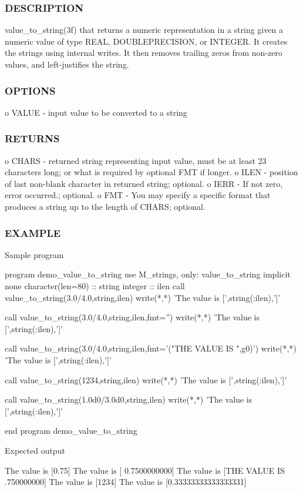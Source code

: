 \subsubsection*{D\+E\+S\+C\+R\+I\+P\+T\+I\+ON}

\begin{DoxyVerb}value_to_string(3f)
that returns a numeric representation in a string given a numeric value of type
REAL, DOUBLEPRECISION, or INTEGER. It creates the strings using internal writes.
It then removes trailing zeros from non-zero values, and left-justifies the string.
\end{DoxyVerb}


\subsubsection*{O\+P\+T\+I\+O\+NS}

o V\+A\+L\+UE -\/ input value to be converted to a string \subsubsection*{R\+E\+T\+U\+R\+NS}

o C\+H\+A\+RS -\/ returned string representing input value, must be at least 23 characters long; or what is required by optional F\+MT if longer. o I\+L\+EN -\/ position of last non-\/blank character in returned string; optional. o I\+E\+RR -\/ If not zero, error occurred.; optional. o F\+MT -\/ You may specify a specific format that produces a string up to the length of C\+H\+A\+RS; optional.

\subsubsection*{E\+X\+A\+M\+P\+LE}

\begin{DoxyVerb}Sample program

  program demo_value_to_string
  use M_strings, only: value_to_string
  implicit none
  character(len=80) :: string
  integer           :: ilen
     call value_to_string(3.0/4.0,string,ilen)
     write(*,*) 'The value is [',string(:ilen),']'

     call value_to_string(3.0/4.0,string,ilen,fmt='')
     write(*,*) 'The value is [',string(:ilen),']'

     call value_to_string(3.0/4.0,string,ilen,fmt='("THE VALUE IS ",g0)')
     write(*,*) 'The value is [',string(:ilen),']'

     call value_to_string(1234,string,ilen)
     write(*,*) 'The value is [',string(:ilen),']'

     call value_to_string(1.0d0/3.0d0,string,ilen)
     write(*,*) 'The value is [',string(:ilen),']'

  end program demo_value_to_string

Expected output

 The value is [0.75]
 The value is [      0.7500000000]
 The value is [THE VALUE IS .750000000]
 The value is [1234]
 The value is [0.33333333333333331] \end{DoxyVerb}
 

